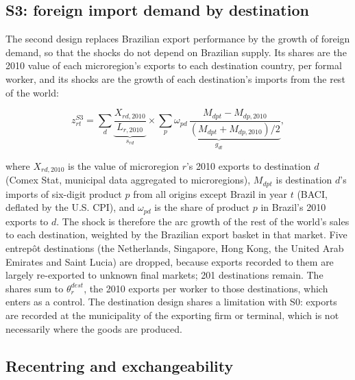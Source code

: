 \documentclass[
	11pt,				%
	oneside,			%
	a4paper,			%
	english,			%
	english				%
	]{abntex2ppgsi}
\theoremstyle{plain}
\theoremstyle{remark}
\theoremstyle{plain}%
\theoremstyle{remark}%
\begin{document}
\subsection{S3: foreign import demand by destination}

The second design replaces Brazilian export performance by the growth of foreign demand, so that the shocks do not depend on Brazilian supply. Its shares are the 2010 value of each microregion's exports to each destination country, per formal worker, and its shocks are the growth of each destination's imports from the rest of the world:

\begin{equation}
z^{S3}_{rt} = \sum_d \underbrace{\frac{X_{rd,2010}}{L_{r,2010}}}_{s_{rd}} \times \underbrace{\sum_p \omega_{pd}\, \frac{M_{dpt} - M_{dp,2010}}{(M_{dpt} + M_{dp,2010})/2}}_{g_{dt}},
\label{eq:s3}
\end{equation}

\noindent where $X_{rd,2010}$ is the value of microregion $r$'s 2010 exports to destination $d$ (Comex Stat, municipal data aggregated to microregions), $M_{dpt}$ is destination $d$'s imports of six-digit product $p$ from all origins except Brazil in year $t$ (BACI, deflated by the U.S. CPI), and $\omega_{pd}$ is the share of product $p$ in Brazil's 2010 exports to $d$. The shock is therefore the arc growth of the rest of the world's sales to each destination, weighted by the Brazilian export basket in that market. Five entrepôt destinations (the Netherlands, Singapore, Hong Kong, the United Arab Emirates and Saint Lucia) are dropped, because exports recorded to them are largely re-exported to unknown final markets; 201 destinations remain. The shares sum to $\theta^{dest}_r$, the 2010 exports per worker to those destinations, which enters as a control. The destination design shares a limitation with S0: exports are recorded at the municipality of the exporting firm or terminal, which is not necessarily where the goods are produced.

\subsection{Recentring and exchangeability}
\label{sec:recentring}
\end{document}
